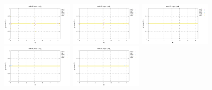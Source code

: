 \noindent
\includegraphics[width=3.5cm]{python_codes/fieldstone_152/RESULTS/exp1_2D/qqq_64_m2}
\includegraphics[width=3.5cm]{python_codes/fieldstone_152/RESULTS/exp1_2D/qqq_64_m3}
\includegraphics[width=3.5cm]{python_codes/fieldstone_152/RESULTS/exp1_2D/qqq_64_m4}
\includegraphics[width=3.5cm]{python_codes/fieldstone_152/RESULTS/exp1_2D/qqq_64_m5}
\includegraphics[width=3.5cm]{python_codes/fieldstone_152/RESULTS/exp1_2D/qqq_64_m6}

